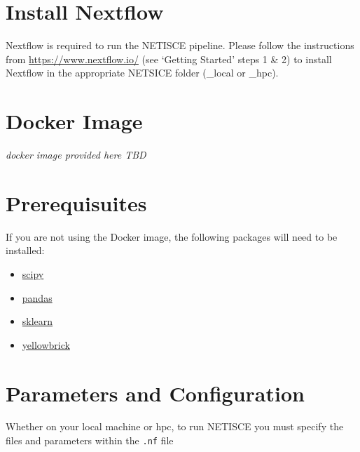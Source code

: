 \documentclass[
]{book}
\providecommand{\tightlist}{%
  \setlength{\itemsep}{0pt}\setlength{\parskip}{0pt}}
\begin{document}
\hypertarget{install-nextflow}{%
\section{Install Nextflow}\label{install-nextflow}}

Nextflow is required to run the NETISCE pipeline. Please follow the instructions from \url{https://www.nextflow.io/} (see `Getting Started' steps 1 \& 2) to install Nextflow in the appropriate NETSICE folder (\_local or \_hpc).

\hypertarget{docker-image}{%
\section{Docker Image}\label{docker-image}}

\emph{docker image provided here TBD}

\hypertarget{prerequisuites}{%
\section{Prerequisuites}\label{prerequisuites}}

If you are not using the Docker image, the following packages will need to be installed:

\begin{itemize}
\tightlist
\item
  \href{https://scipy.org/install/}{scipy}
\item
  \href{https://pandas.pydata.org/getting_started.html}{pandas}
\item
  \href{https://scikit-learn.org/stable/install.html}{sklearn}
\item
  \href{https://www.scikit-yb.org/en/latest/quickstart.html}{yellowbrick}
\end{itemize}

\hypertarget{params}{%
\section{Parameters and Configuration}\label{params}}

Whether on your local machine or hpc, to run NETISCE you must specify the files and parameters within the \texttt{.nf} file
\end{document}
